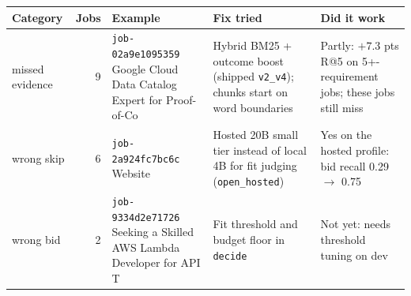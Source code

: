 \begin{tabular}{>{\raggedright\arraybackslash}p{2.2cm}r>{\raggedright\arraybackslash}p{3.6cm}>{\raggedright\arraybackslash}p{4.4cm}>{\raggedright\arraybackslash}p{3.6cm}}
\toprule
Category & Jobs & Example & Fix tried & Did it work \\
\midrule
missed evidence & 9 & \texttt{job-02a9e1095359} Google Cloud Data Catalog Expert for Proof-of-Co & Hybrid BM25 + outcome boost (shipped \texttt{v2\_v4}); chunks start on word boundaries & Partly: $+7.3$ pts R@5 on 5+-requirement jobs; these jobs still miss \\
wrong skip & 6 & \texttt{job-2a924fc7bc6c} Website & Hosted 20B small tier instead of local 4B for fit judging (\texttt{open\_hosted}) & Yes on the hosted profile: bid recall 0.29 $\to$ 0.75 \\
wrong bid & 2 & \texttt{job-9334d2e71726} Seeking a Skilled AWS Lambda Developer for API T & Fit threshold and budget floor in \texttt{decide} & Not yet: needs threshold tuning on dev \\
\bottomrule
\end{tabular}
